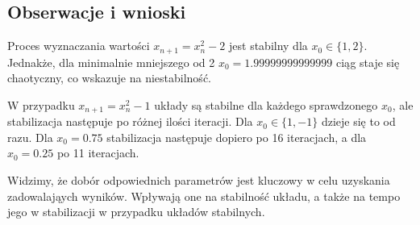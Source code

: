 \documentclass{article}
\begin{document}
\subsection{Obserwacje i wnioski}
Proces wyznaczania wartości $x_{n + 1} = x_n^2 - 2$ jest stabilny dla $x_0 \in \{1, 2\}$. Jednakże, dla minimalnie
mniejszego od 2 $x_0 = 1.99999999999999$ ciąg staje się chaotyczny, co wskazuje na niestabilność.

W przypadku $x_{n + 1} = x_n^2 - 1$ układy są stabilne dla każdego sprawdzonego $x_0$, ale stabilizacja następuje po
różnej ilości iteracji. Dla $x_0 \in \{1, -1\}$ dzieje się to od razu. Dla $x_0 = 0.75$ stabilizacja następuje dopiero
po 16 iteracjach, a dla $x_0 = 0.25$ po 11 iteracjach.

Widzimy, że dobór odpowiednich parametrów jest kluczowy w celu uzyskania zadowalająych wyników. Wpływają one na
stabilność układu, a także na tempo jego w stabilizacji w przypadku układów stabilnych.
\end{document}
